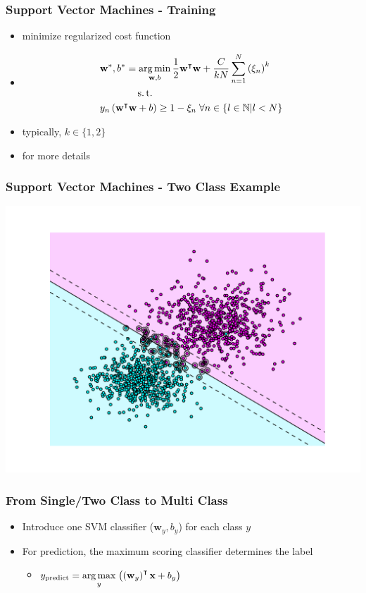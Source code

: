 \begin{frame}
    \frametitle{Support Vector Machines - Training }
    \begin{itemize}
          \item minimize regularized cost function
          \item[] \begin{align}
            &\textbf{w}^*, b^*  = \argmin_{\textbf{w}, b} \frac{1}{2} \textbf{w}^{\intercal} \textbf{w}
            + \frac{C}{kN}\sum_{n=1}^N\left(\xi_n\right)^k \\
            &\phantom{\textbf{w}^*, b^*  = }\st \nonumber \\ 
            &y_n\left(\textbf{w}^\intercal\textbf{w}+b\right) \geq 1 - \xi_n \; \forall n \in \{l \in
            \mathbb{N} | l < N\}
        \end{align}
          \item typically, $k\in\{1,2\}$
        \item {} for more details
    \end{itemize}
\end{frame}


\begin{frame}
    \frametitle{Support Vector Machines - Two Class Example}
    \includegraphics[width=\textwidth]{images/two_class_svm.pdf}
\end{frame}


\begin{frame}
    \frametitle{From Single/Two Class to Multi Class}
    \begin{itemize}
          \item Introduce one SVM classifier ($\textbf{w}_y, b_y$) for each class $y$
          \item For prediction, the maximum scoring classifier determines the label
        \begin{itemize}
              \item[] $\displaystyle y_{\text{predict}} = \operatorname*{arg\,max}_y \;
            \bigl(\left(\textbf{w}_y\right)^{\intercal}\textbf{x} + b_y\bigr) $
        \end{itemize}
    \end{itemize}
\end{frame}


